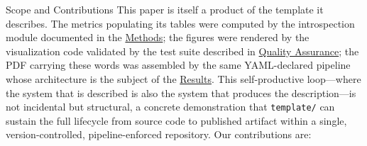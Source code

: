 \documentclass[
  ignorenonframetext,
]{beamer}
\begin{document}
\begin{frame}{Scope and Contributions}
\protect{}\label{scope-and-contributions}
This paper is itself a product of the template it describes. The metrics
populating its tables were computed by the introspection module
documented in the \href{03a_architecture.md\#methods}{Methods}; the
figures were rendered by the visualization code validated by the test
suite described in \href{03e_quality.md\#quality-assurance}{Quality
Assurance}; the PDF carrying these words was assembled by the same
YAML-declared pipeline whose architecture is the subject of the
\href{04_results.md\#results}{Results}. This self-productive
loop---where the system that is described is also the system that
produces the description---is not incidental but structural, a concrete
demonstration that \texttt{template/} can sustain the full lifecycle
from source code to published artifact within a single,
version-controlled, pipeline-enforced repository. Our contributions are:


\end{frame}
\end{document}
